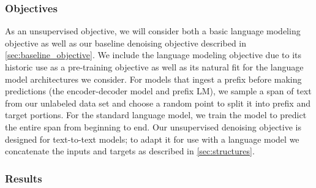 \documentclass[twoside,11pt]{article}
\begin{document}
\subsubsection{Objectives}
\label{sec:architecture_objectives}

As an unsupervised objective, we will consider both a basic language modeling objective as well as our baseline denoising objective described in \cref{sec:baseline_objective}.
We include the language modeling objective due to its historic use as a pre-training objective \citep{dai2015semi,ramachandran2016unsupervised,howard2018universal,radford2018improving,peters2018deep} as well as its natural fit for the language model architectures we consider.
For models that ingest a prefix before making predictions (the encoder-decoder model and prefix LM), we sample a span of text from our unlabeled data set and choose a random point to split it into prefix and target portions.
For the standard language model, we train the model to predict the entire span from beginning to end.
Our unsupervised denoising objective is designed for text-to-text models; to adapt it for use with a language model we concatenate the inputs and targets as described in \cref{sec:structures}.

\subsubsection{Results}
\end{document}

